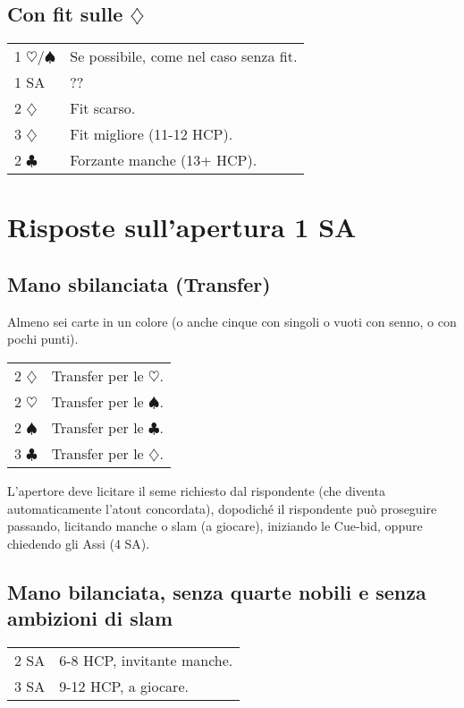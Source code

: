 \documentclass[a4paper,10pt]{article}
\renewcommand{\c}{$\clubsuit$\xspace}
\renewcommand{\d}{$\diamondsuit$\xspace}
\newcommand{\h}{$\heartsuit$\xspace}
\newcommand{\s}{$\spadesuit$\xspace}
\newcommand{\sa}{SA\xspace}
\newcommand{\smallspace}{\vskip0.3cm}
\newenvironment{twocol}
  {\smallspace\noindent\begin{tabular}{l p{0.8\textwidth}}}
  {\end{tabular}\smallspace}
\begin{document}
\subsection{Con fit sulle \d}

\begin{twocol}
 1 \h/\s & Se possibile, come nel caso senza fit.\\
 1 \sa & ??\\
 2 \d  & Fit scarso.\\
 3 \d  & Fit migliore (11-12 HCP).\\
 2 \c  & Forzante manche (13+ HCP).\\
\end{twocol}



\pagebreak

\section{Risposte sull'apertura 1 SA}

\subsection{Mano sbilanciata (Transfer)}

Almeno sei carte in un colore (o anche cinque con singoli o vuoti con senno, o con pochi punti).

\begin{twocol}
 2 \d & Transfer per le \h.\\
 2 \h & Transfer per le \s.\\
 2 \s & Transfer per le \c.\\
 3 \c & Transfer per le \d.\\
\end{twocol}

L'apertore deve licitare il seme richiesto dal rispondente (che diventa automaticamente l'atout concordata), dopodiché il rispondente può proseguire passando, licitando manche o slam (a giocare), iniziando le Cue-bid, oppure chiedendo gli Assi (4 \sa).


\subsection{Mano bilanciata, senza quarte nobili e senza ambizioni di slam}

\begin{twocol}
 2 \sa & 6-8 HCP, invitante manche.\\
 3 \sa & 9-12 HCP, a giocare.
\end{twocol}
\end{document}
